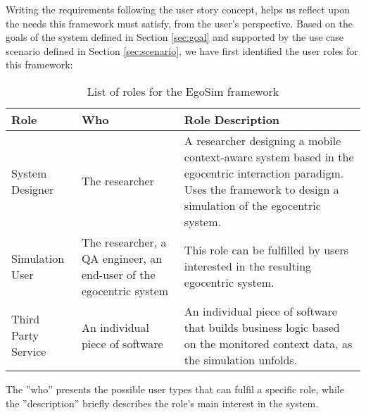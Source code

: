 Writing the requirements following the user story concept, helps us reflect upon the needs this framework must satisfy, from the user's perspective. Based on the goals of the system defined in Section \ref{sec:goal} and supported by the use case scenario defined in Section \ref{sec:scenario}, we have first identified the user roles for this framework:
\begin{table}[H]
	\begin{center}
		\small \begin{tabular*}{1.1\columnwidth}{p{3cm}p{3cm}p{5.5cm}} 
			\\ \hline \hline
			Role & Who & Role Description \\ \hline \hline

		 	System Designer & The researcher & A researcher designing a mobile context-aware system based in the egocentric interaction paradigm. Uses the framework to design a simulation of the egocentric system.\\ \hline

		 	Simulation User & The researcher, a QA engineer, an end-user of the egocentric system & This role can be fulfilled by users interested in the resulting egocentric system.\\ \hline

		 	Third Party Service & An individual piece of software & An individual piece of software that builds business logic based on the monitored context data, as the simulation unfolds.\\ \hline
		\end{tabular*}
		
		\caption{List of roles for the EgoSim framework}
		\label{table:roles}
	\end{center}
\end{table}
The ''who'' presents the possible user types that can fulfil a specific role, while the ''description'' briefly describes the role's main interest in the system.\\

